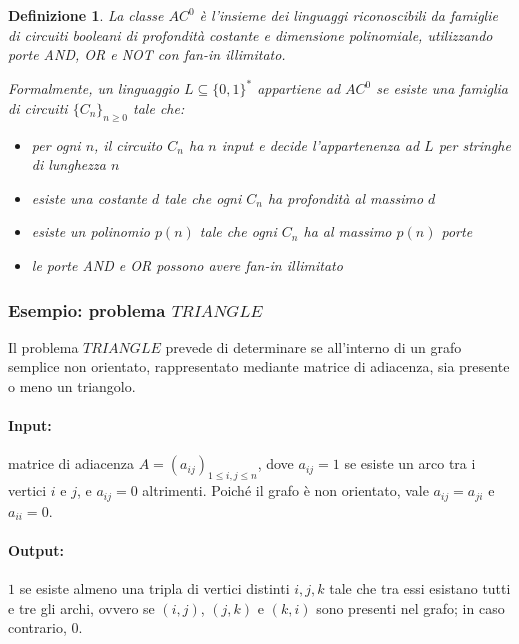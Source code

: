 \documentclass[a4paper,12pt]{report}
\newtheorem{definition}{Definizione}[chapter]
\theoremstyle{propositionstyle}
\begin{document}
    \begin{definition}
        La classe $AC^0$ è l'insieme dei linguaggi riconoscibili da famiglie di circuiti booleani di profondità costante e dimensione polinomiale, utilizzando porte AND, OR e NOT con fan-in illimitato.

        Formalmente, un linguaggio $L \subseteq \{0,1\}^*$ appartiene ad $AC^0$ se esiste una famiglia di circuiti $\{C_n\}_{n \geq 0}$ tale che:
        \begin{itemize}
            \item per ogni $n$, il circuito $C_n$ ha $n$ input e decide l'appartenenza ad $L$ per stringhe di lunghezza $n$
            \item esiste una costante $d$ tale che ogni $C_n$ ha profondità al massimo $d$
            \item esiste un polinomio $p(n)$ tale che ogni $C_n$ ha al massimo $p(n)$ porte
            \item le porte AND e OR possono avere fan-in illimitato
        \end{itemize}
    \end{definition}

    \subsubsection{Esempio: problema $TRIANGLE$}
    Il problema $TRIANGLE$ prevede di determinare se all'interno di un grafo semplice non orientato, rappresentato mediante matrice di adiacenza,
    sia presente o meno un triangolo.

    \paragraph{Input:}
    matrice di adiacenza $A = (a_{ij})_{1 \leq i,j \leq n}$, dove $a_{ij} = 1$ se esiste un arco tra i vertici $i$ e $j$, e $a_{ij} = 0$ altrimenti.
    Poiché il grafo è non orientato, vale $a_{ij} = a_{ji}$ e $a_{ii} = 0$.

    \paragraph{Output:}
    $1$ se esiste almeno una tripla di vertici distinti $i,j,k$ tale che tra essi esistano tutti e tre gli archi,
    ovvero se $(i,j)$, $(j,k)$ e $(k,i)$ sono presenti nel grafo; in caso contrario, $0$.
\end{document}
